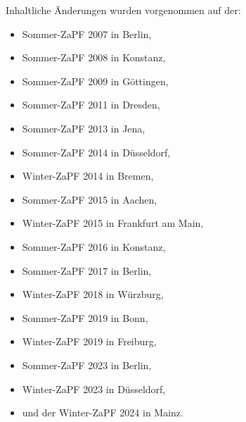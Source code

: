\documentclass[
  a4paper,
  oneside]{scrartcl}
\providecommand{\tightlist}{%
  \setlength{\itemsep}{0pt}\setlength{\parskip}{0pt}}
\begin{document}
Inhaltliche Änderungen wurden vorgenommen auf der:

\begin{itemize}
\tightlist
\item
  Sommer-ZaPF 2007 in Berlin,
\item
  Sommer-ZaPF 2008 in Konstanz,
\item
  Sommer-ZaPF 2009 in Göttingen,
\item
  Sommer-ZaPF 2011 in Dresden,
\item
  Sommer-ZaPF 2013 in Jena,
\item
  Sommer-ZaPF 2014 in Düsseldorf,
\item
  Winter-ZaPF 2014 in Bremen,
\item
  Sommer-ZaPF 2015 in Aachen,
\item
  Winter-ZaPF 2015 in Frankfurt am Main,
\item
  Sommer-ZaPF 2016 in Konstanz,
\item
  Sommer-ZaPF 2017 in Berlin,
\item
  Winter-ZaPF 2018 in Würzburg,
\item
  Sommer-ZaPF 2019 in Bonn,
\item
  Winter-ZaPF 2019 in Freiburg,
\item
  Sommer-ZaPF 2023 in Berlin,
\item
  Winter-ZaPF 2023 in Düsseldorf,
\item
  und der Winter-ZaPF 2024 in Mainz.
\end{itemize}
\end{document}
